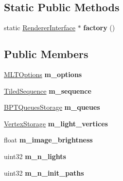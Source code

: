 \subsection*{Static Public Methods}
\begin{DoxyCompactItemize}
\item 
\mbox{\label{struct_m_l_t_a135881654f589ac26b4a4c25a10fbd9a}} 
static \hyperlink{struct_renderer_interface}{Renderer\+Interface} $\ast$ {\bfseries factory} ()
\end{DoxyCompactItemize}
\subsection*{Public Members}
\begin{DoxyCompactItemize}
\item 
\mbox{\label{struct_m_l_t_a441bc00efd7dcd4825cfdd8d3b9929dd}} 
\hyperlink{struct_m_l_t_options}{M\+L\+T\+Options} {\bfseries m\+\_\+options}
\item 
\mbox{\label{struct_m_l_t_a5c2a4a12778157241cc41a7fba1d4716}} 
\hyperlink{struct_tiled_sequence}{Tiled\+Sequence} {\bfseries m\+\_\+sequence}
\item 
\mbox{\label{struct_m_l_t_ad007c6bcbaf693d05c983ddaf575f9db}} 
\hyperlink{struct_b_p_t_queues_storage}{B\+P\+T\+Queues\+Storage} {\bfseries m\+\_\+queues}
\item 
\mbox{\label{struct_m_l_t_a69bd07522df9f672cc68ad189ebe89b9}} 
\hyperlink{struct_vertex_storage}{Vertex\+Storage} {\bfseries m\+\_\+light\+\_\+vertices}
\item 
\mbox{\label{struct_m_l_t_a6a981cdc9402b17fdc6570018957508f}} 
float {\bfseries m\+\_\+image\+\_\+brightness}
\item 
\mbox{\label{struct_m_l_t_a13f5cd6942497f3426793814d17c8453}} 
uint32 {\bfseries m\+\_\+n\+\_\+lights}
\item 
\mbox{\label{struct_m_l_t_afa51ded5b41b34ef85359995db675b8f}} 
uint32 {\bfseries m\+\_\+n\+\_\+init\+\_\+paths}
\item 
\mbox{\label{struct_m_l_t_a98d38ad5e68c658cd176fb01dab5f798}} 

\end{DoxyCompactItemize}
